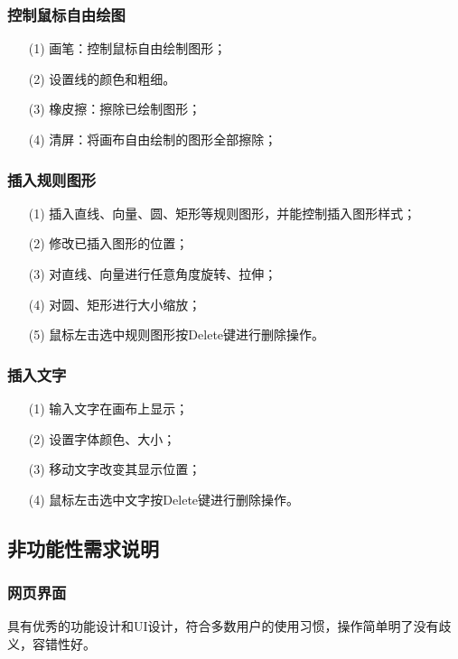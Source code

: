 \documentclass[lang=cn]{elegantpaper}
\begin{document}
\subsubsection{控制鼠标自由绘图}
\begin{itemize}
	\item [(1)]画笔：控制鼠标自由绘制图形；
	\item [(2)]设置线的颜色和粗细。
	\item [(3)]橡皮擦：擦除已绘制图形；
	\item [(4)]清屏：将画布自由绘制的图形全部擦除；
\end{itemize}

\subsubsection{插入规则图形}
\begin{itemize}
	\item [(1)]插入直线、向量、圆、矩形等规则图形，并能控制插入图形样式；
	\item [(2)]修改已插入图形的位置；
	\item [(3)]对直线、向量进行任意角度旋转、拉伸；
	\item [(4)]对圆、矩形进行大小缩放；
	\item [(5)]鼠标左击选中规则图形按Delete键进行删除操作。
\end{itemize}
	
\subsubsection{插入文字}
\begin{itemize}
	\item [(1)]输入文字在画布上显示；
	\item [(2)]设置字体颜色、大小；
	\item [(3)]移动文字改变其显示位置；
	\item [(4)]鼠标左击选中文字按Delete键进行删除操作。
\end{itemize}

\subsection{非功能性需求说明}
\subsubsection{网页界面}
具有优秀的功能设计和UI设计，符合多数用户的使用习惯，操作简单明了没有歧义，容错性好。
\end{document}
